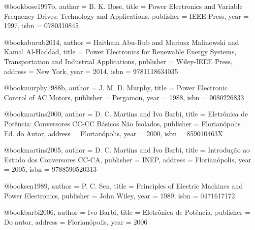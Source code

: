 @book{bose1997b,
  author = {B. K. Bose},
  title = {Power Electronics and Variable Frequency Drives: Technology and Applications},
  publisher = {IEEE Press},
  year = {1997},
  isbn = {0780310845}
}

@book{aburub2014,
  author = {Haitham Abu-Rub and Mariusz Malinowski and Kamal Al-Haddad},
  title = {Power Electronics for Renewable Energy Systems, Transportation and Industrial Applications},
  publisher = {Wiley-IEEE Press},
  address = {New York},
  year = {2014},
  isbn = {9781118634035}
}

@book{murphy1988b,
  author = {J. M. D. Murphy},
  title = {Power Electronic Control of AC Motors},
  publisher = {Pergamon},
  year = {1988},
  isbn = {0080226833}
}

@book{martins2000,
  author = {D. C. Martins and Ivo Barbi},
  title = {Eletrônica de Potência: Conversores CC-CC Básicos Não Isolados},
  publisher = {Florianópolis Ed. do Autor},
  address = {Florianópolis},
  year = {2000},
  isbn = {859010463X}
}

@book{martins2005,
  author = {D. C. Martins and Ivo Barbi},
  title = {Introdução ao Estudo dos Conversores CC-CA},
  publisher = {INEP},
  address = {Florianópolis},
  year = {2005},
  isbn = {9788590520313}
}

@book{sen1989,
  author = {P. C. Sen},
  title = {Principles of Electric Machines and Power Electronics},
  publisher = {John Wiley},
  year = {1989},
  isbn = {0471617172}
}

@book{barbi2006,
  author = {Ivo Barbi},
  title = {Eletrônica de Potência},
  publisher = {Do autor},
  address = {Florianópolis},
  year = {2006}
}

